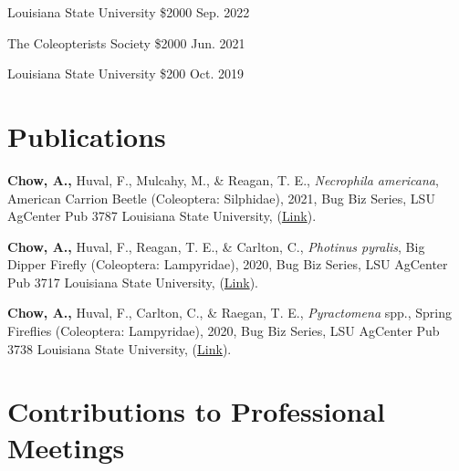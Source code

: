 \documentclass{article}
\newcommand{\hindent}{\hangindent=10pt}
\begin{document}
{Louisiana State University}
{\$2000} 
{Sep. 2022} %

{The Coleopterists Society}
{\$2000} 
{Jun. 2021} %

{Louisiana State University} 
{\$200}
{Oct. 2019} %

\section{Publications}
\newcommand{\BugBiz}[5]{
    \noindent
    \hindent
    {#1} %
    {#2}, %
    {#3}, %
    Bug Biz Series, LSU AgCenter Pub 
    {#4}
    Louisiana State University,
    (\href{#5}{Link}).%
}

\BugBiz{\textbf{\textbf{Chow, A.,}} Huval, F., Mulcahy, M., \& Reagan, T. E.,}
{\textit{Necrophila americana}, American Carrion Beetle (Coleoptera: Silphidae)}
{2021}
{3787}
{https://www.lsuagcenter.com/articles/page1619566292701}

\BugBiz{\textbf{\textbf{Chow, A.,}} Huval, F., Reagan, T. E., \& Carlton, C.,}
{\textit{Photinus pyralis}, Big Dipper Firefly (Coleoptera: Lampyridae)}
{2020}
{3717}
{https://www.lsuagcenter.com/profiles/bneely/articles/page1587050468972}

\BugBiz{\textbf{\textbf{Chow, A.,}} Huval, F., Carlton, C., \& Raegan, T. E.,} 
{\textit{Pyractomena} spp., Spring Fireflies (Coleoptera: Lampyridae)}
{2020}
{3738}
{https://www.lsuagcenter.com/profiles/bneely/articles/page1590080943471}

\section{Contributions to Professional Meetings}
\newcommand{\presentation}[6]{
    \noindent
    \hindent
    \small
    {#1} %
    {#2}, %
    {#3}, %
    {#5}, %
    {#4}. %
    (\href{#6}{Link}) %
    \normalsize \par
}
\end{document}
